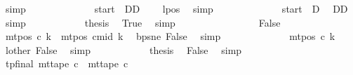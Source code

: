 \begin{isabellebody}
\ simp\isanewline
\ \ \ \ \ \ \ \ \isamarkupfalse%
\ \isamarkupfalse%
\ {\isachardoublequoteopen}{\isasymdots}\ {\isacharequal}{\kern0pt}\ {\isacharparenleft}{\kern0pt}{\isacharquery}{\kern0pt}start\ {\isacharminus}{\kern0pt}\ DD{\isacharparenright}{\kern0pt}\ {\isacharminus}{\kern0pt}\ {}{\isachardoublequoteclose}\ \isamarkupfalse%
\ lpos\ \isamarkupfalse%
\ simp\isanewline
\ \ \ \ \ \ \ \ \isamarkupfalse%
\ \isamarkupfalse%
\ {\isachardoublequoteopen}{\isasymdots}\ {\isacharequal}{\kern0pt}\ {\isacharquery}{\kern0pt}start\ {\isacharminus}{\kern0pt}\ {\isacharquery}{\kern0pt}D{\isachardoublequoteclose}\ \isamarkupfalse%
\ DD\ \isamarkupfalse%
\ simp\isanewline
\ \ \ \ \ \ \ \ \isamarkupfalse%
\ \isamarkupfalse%
\ {\isacharquery}{\kern0pt}thesis\ \isamarkupfalse%
\ True\ \isamarkupfalse%
\ simp\isanewline
\ \ \ \ \ \ \isamarkupfalse%
\isanewline
\ \ \ \ \ \ \ \ \isamarkupfalse%
\ False\isanewline
\ \ \ \ \ \ \ \ \isamarkupfalse%
\ {\isachardoublequoteopen}mt{\isacharunderscore}{\kern0pt}pos\ c{\isacharprime}{\kern0pt}\ k{\isacharprime}{\kern0pt}\ {\isacharequal}{\kern0pt}\ mt{\isacharunderscore}{\kern0pt}pos\ cmid\ k{\isacharprime}{\kern0pt}{\isachardoublequoteclose}\ \isamarkupfalse%
\ bps{\isacharunderscore}{\kern0pt}ne\ False\ \isamarkupfalse%
\ simp\isanewline
\ \ \ \ \ \ \ \ \isamarkupfalse%
\ \isamarkupfalse%
\ {\isachardoublequoteopen}{\isasymdots}\ {\isacharequal}{\kern0pt}\ mt{\isacharunderscore}{\kern0pt}pos\ c{}\ k{\isacharprime}{\kern0pt}{\isachardoublequoteclose}\ \isamarkupfalse%
\ lother\ False\ \isamarkupfalse%
\ simp\isanewline
\ \ \ \ \ \ \ \ \isamarkupfalse%
\ \isamarkupfalse%
\ {\isacharquery}{\kern0pt}thesis\ \isamarkupfalse%
\ False\ \isamarkupfalse%
\ simp\isanewline
\ \ \ \ \ \ \isamarkupfalse%
\isanewline
\ \ \ \ \isamarkupfalse%
\isanewline
\ \ \ \ \isamarkupfalse%
\ tp{\isacharunderscore}{\kern0pt}final{\isacharcolon}{\kern0pt}\ {\isachardoublequoteopen}mt{\isacharunderscore}{\kern0pt}tape\ c{\isacharprime}{\kern0pt}\ {\isacharequal}{\kern0pt}\ mt{\isacharunderscore}{\kern0pt}tape\ c{}{\isachardoublequoteclose}\ \isamarkupfalse%

\end{isabellebody}
